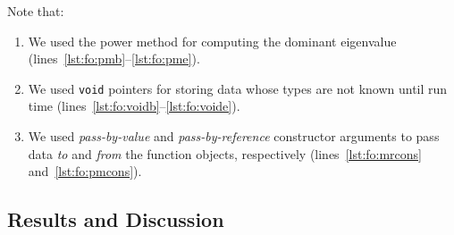 \documentclass[10pt,a4paper]{article}
\theoremstyle{definition}\newtheorem{problem}{Problem}
\begin{document}
\noindent
Note that:
\begin{enumerate}

\item We used the power method for computing the dominant eigenvalue (lines~\ref{lst:fo:pmb}--\ref{lst:fo:pme}). 

\item We used \texttt{void} pointers for storing data whose types are not known until run time (lines~\ref{lst:fo:voidb}--\ref{lst:fo:voide}).

\item We used \emph{pass-by-value} and \emph{pass-by-reference} constructor arguments to pass data \emph{to} and \emph{from} the function objects, respectively (lines~\ref{lst:fo:mrcons} and~\ref{lst:fo:pmcons}).

\end{enumerate}

\subsection{Results and Discussion}
\end{document}
